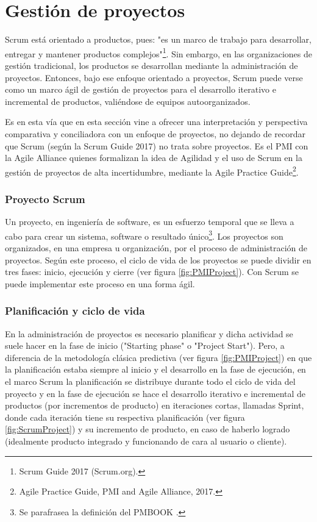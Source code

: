 \chapter{Gestión de proyectos}

Scrum está orientado a productos, pues: "es un marco de trabajo para desarrollar, entregar y mantener productos complejos"\footnote{Scrum Guide 2017 (Scrum.org).}. Sin embargo, en las organizaciones de gestión tradicional, los productos se desarrollan mediante la administración de proyectos. Entonces, bajo ese enfoque orientado a proyectos, Scrum puede verse como un marco ágil de gestión de proyectos para el desarrollo iterativo e incremental de productos, valiéndose de equipos autoorganizados. 

Es en esta vía que en esta sección vine a ofrecer una interpretación y perspectiva comparativa y conciliadora con un enfoque de proyectos, no dejando de recordar que Scrum (según la Scrum Guide 2017) no trata sobre proyectos. Es el PMI con la Agile Alliance quienes formalizan la idea de Agilidad y el uso de Scrum en la gestión de proyectos de alta incertidumbre, mediante la Agile Practice Guide\footnote{Agile Practice Guide, PMI and Agile Alliance, 2017.}.

\subsection{Proyecto Scrum}

Un proyecto, en ingeniería de software, es un esfuerzo temporal que se lleva a cabo para crear un sistema, software o resultado único\footnote{Se parafrasea la definición del PMBOOK \cite{PMBOK-2004}.}. Los proyectos son organizados, en una empresa u organización, por el proceso de administración de proyectos. Según este proceso, el ciclo de vida de los proyectos se puede dividir en tres fases: inicio, ejecución y cierre (ver figura \ref{fig:PMIProject}). Con Scrum se puede implementar este proceso en una forma ágil.

\subsection{Planificación y ciclo de vida}

En la administración de proyectos es necesario planificar y dicha actividad se suele hacer en la fase de inicio ("Starting phase" o "Project Start"). Pero, a diferencia de la metodología clásica predictiva (ver figura \ref{fig:PMIProject}) en que la planificación estaba siempre al inicio y el desarrollo en la fase de ejecución, en el marco Scrum la planificación se distribuye durante todo el ciclo de vida del proyecto y en la fase de ejecución se hace el desarrollo iterativo e incremental de productos (por incrementos de producto) en iteraciones cortas, llamadas Sprint, donde cada iteración tiene su respectiva planificación (ver figura \ref{fig:ScrumProject}) y su incremento de producto, en caso de haberlo logrado (idealmente producto integrado y funcionando de cara al usuario o cliente).

